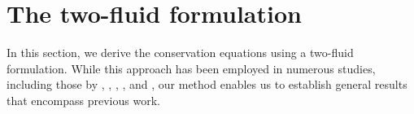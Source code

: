 \section{The two-fluid formulation}
\label{sec:two-fluid}

In this section, we derive the conservation equations using a two-fluid formulation. While this approach has been employed in numerous studies, including those by \citet{kataoka1986local}, \citet{lhuillier2010multiphase}, \citet{ishii2010thermo}, \citet{morel2015mathematical}, and \citet{bothe2022sharp}, our method enables us to establish general results that encompass previous work. 

